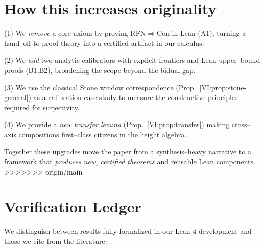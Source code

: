 \documentclass[11pt]{article}
\theoremstyle{definition}
\theoremstyle{remark}
\begin{document}
\section{How this increases originality}

(1) We \emph{remove} a core axiom by proving RFN\(\Rightarrow\)Con in Lean (A1), turning a hand–off to proof theory into a certified artifact in our calculus.

(2) We \emph{add} two analytic calibrators with explicit frontiers and Lean upper–bound proofs (B1,B2), broadening the scope beyond the bidual gap.

(3) We use the classical Stone window correspondence (Prop.~\ref{VI:prop:stone-general}) as a calibration case study to measure the constructive principles required for surjectivity.

(4) We provide a \emph{new transfer lemma} (Prop.~\ref{VI:prop:transfer}) making cross–axis compositions first–class citizens in the height algebra.

Together these upgrades move the paper from a synthesis–heavy narrative to a framework that \emph{produces new, certified theorems} and reusable Lean components.
>>>>>>> origin/main










\section{Verification Ledger}\label{sec:verification}

We distinguish between results fully formalized in our Lean 4 development and those we cite from the literature:
\end{document}

